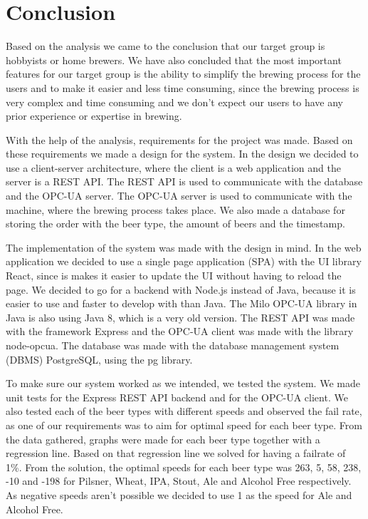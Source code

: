 \section{Conclusion}
Based on the analysis we came to the conclusion that our target group is hobbyists or home brewers.
We have also concluded that the most important features for our target group is the ability to simplify the brewing process for the users and
to make it easier and less time consuming, since the brewing process is very complex and time consuming
and we don't expect our users to have any prior experience or expertise in brewing.\newline

With the help of the analysis, requirements for the project was made.
Based on these requirements we made a design for the system.
In the design we decided to use a client-server architecture, where the client is a web application and the server is a REST API.
The REST API is used to communicate with the database and the OPC-UA server.
The OPC-UA server is used to communicate with the machine, where the brewing process takes place.
We also made a database for storing the order with the beer type, the amount of beers and the timestamp.\newline

The implementation of the system was made with the design in mind.
In the web application we decided to use a single page application (SPA) with the UI library React,
since is makes it easier to update the UI without having to reload the page.
We decided to go for a backend with Node.js instead of Java, because it is easier to use and faster to develop with than Java.
The Milo OPC-UA library in Java is also using Java 8, which is a very old version.
The REST API was made with the framework Express and the OPC-UA client was made with the library node-opcua.
The database was made with the database management system (DBMS) PostgreSQL, using the pg library.\newline

To make sure our system worked as we intended, we tested the system.
We made unit tests for the Express REST API backend and for the OPC-UA client.
We also tested each of the beer types with different speeds and observed the fail rate,
as one of our requirements was to aim for optimal speed for each beer type.
From the data gathered, graphs were made for each beer type together with a regression line.
Based on that regression line we solved for having a failrate of 1\%.
From the solution, the optimal speeds for each beer type was 263, 5, 58, 238, -10 and -198 for Pilsner, Wheat, IPA, Stout, Ale and Alcohol Free respectively.
As negative speeds aren't possible we decided to use 1 as the speed for Ale and Alcohol Free.\newline